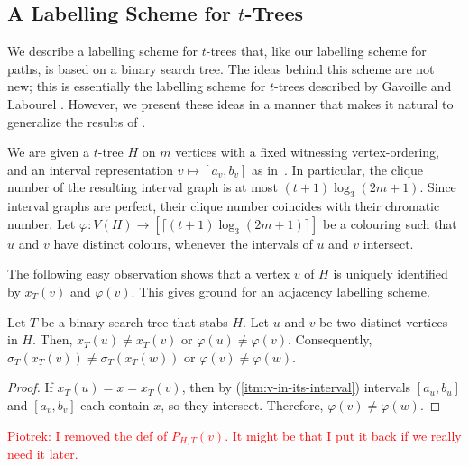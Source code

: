 \documentclass[kpfonts]{patmorin}
\newcommand{\itemref}[1]{(\ref{#1})}
\begin{document}
\subsection{A Labelling Scheme for $t$-Trees}

We describe a labelling scheme for $t$-trees that, like our labelling scheme for paths, is based on a binary search tree.  The ideas behind this scheme are not new; this is essentially the labelling scheme for $t$-trees described by Gavoille and Labourel \cite{gavoille.labourel:shorter}.  However, we present these ideas in a manner that makes it natural to generalize the results of .


We are given a $t$-tree $H$ on $m$ vertices with a fixed witnessing vertex-ordering,
and an interval representation $v\mapsto[a_v,b_v]$ as in~. 
In particular, the clique number of the resulting interval graph is at most $(t+1)\log_3 (2m+1)$.
Since interval graphs are perfect, their clique number coincides with their chromatic number.
Let $\varphi: V(H) \to [\lceil(t+1)\log_3 (2m+1)\rceil]$ be a colouring such that $u$ and $v$ have distinct colours, whenever the intervals of $u$ and $v$ intersect. 

The following easy observation shows that a vertex $v$ of $H$ is uniquely identified by 
$x_T(v)$ and $\varphi(v)$. This gives ground for an adjacency labelling scheme.

\begin{obs}
    Let $T$ be a binary search tree that stabs $H$.
    Let $u$ and $v$ be two distinct vertices in $H$. 
    Then, $x_T(u)\neq x_T(v)$ or $\varphi(u)\neq\varphi(v)$. 
    Consequently, $\sigma_T(x_T(v))\neq \sigma_T(x_T(w))$ or $\varphi(v)\neq\varphi(w)$.
\end{obs}

\begin{proof}
  If $x_T(u)=x=x_T(v)$, then by \itemref{itm:v-in-its-interval} intervals $[a_u,b_u]$ and $[a_v,b_v]$ each contain $x$, 
  so they intersect. 
  Therefore, $\varphi(v)\neq\varphi(w)$.%
\end{proof}

\textcolor{red}{Piotrek: I removed the def of $P_{H,T}(v)$. It might be that I put it back if we really need it later.}
\end{document}
